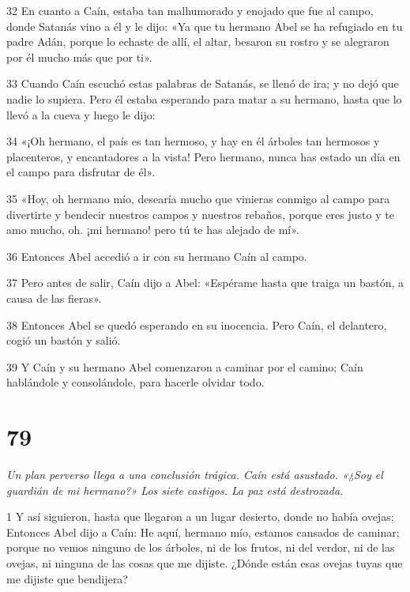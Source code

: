 \par 32 En cuanto a Caín, estaba tan malhumorado y enojado que fue al campo, donde Satanás vino a él y le dijo: «Ya que tu hermano Abel se ha refugiado en tu padre Adán, porque lo echaste de allí, el altar, besaron su rostro y se alegraron por él mucho más que por ti».

\par 33 Cuando Caín escuchó estas palabras de Satanás, se llenó de ira; y no dejó que nadie lo supiera. Pero él estaba esperando para matar a su hermano, hasta que lo llevó a la cueva y luego le dijo:

\par 34 «¡Oh hermano, el país es tan hermoso, y hay en él árboles tan hermosos y placenteros, y encantadores a la vista! Pero hermano, nunca has estado un día en el campo para disfrutar de él».

\par 35 «Hoy, oh hermano mío, desearía mucho que vinieras conmigo al campo para divertirte y bendecir nuestros campos y nuestros rebaños, porque eres justo y te amo mucho, oh. ¡mi hermano! pero tú te has alejado de mí».

\par 36 Entonces Abel accedió a ir con su hermano Caín al campo.

\par 37 Pero antes de salir, Caín dijo a Abel: «Espérame hasta que traiga un bastón, a causa de las fieras».

\par 38 Entonces Abel se quedó esperando en su inocencia. Pero Caín, el delantero, cogió un bastón y salió.

\par 39 Y Caín y su hermano Abel comenzaron a caminar por el camino; Caín hablándole y consolándole, para hacerle olvidar todo.

\chapter{79}

\par \textit{Un plan perverso llega a una conclusión trágica. Caín está asustado. «¿Soy el guardián de mi hermano?» Los siete castigos. La paz está destrozada.}

\par 1 Y así siguieron, hasta que llegaron a un lugar desierto, donde no había ovejas; Entonces Abel dijo a Caín: He aquí, hermano mío, estamos cansados ​​de caminar; porque no vemos ninguno de los árboles, ni de los frutos, ni del verdor, ni de las ovejas, ni ninguna de las cosas que me dijiste. ¿Dónde están esas ovejas tuyas que me dijiste que bendijera?

